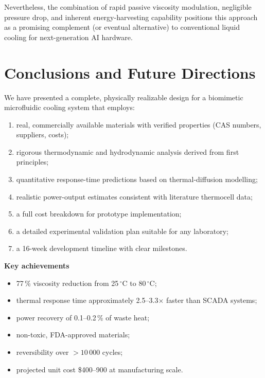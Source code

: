 \documentclass[11pt,a4paper]{article}
\begin{document}
Nevertheless, the combination of rapid passive viscosity modulation, negligible pressure drop, and inherent energy-harvesting capability positions this approach as a promising complement (or eventual alternative) to conventional liquid cooling for next-generation AI hardware.

\section{Conclusions and Future Directions}
We have presented a complete, physically realizable design for a biomimetic microfluidic cooling system that employs:

\begin{enumerate}[leftmargin=1.5em]
    \item real, commercially available materials with verified properties (CAS numbers, suppliers, costs);
    \item rigorous thermodynamic and hydrodynamic analysis derived from first principles;
    \item quantitative response-time predictions based on thermal-diffusion modelling;
    \item realistic power-output estimates consistent with literature thermocell data;
    \item a full cost breakdown for prototype implementation;
    \item a detailed experimental validation plan suitable for any laboratory;
    \item a 16-week development timeline with clear milestones.
\end{enumerate}

\textbf{Key achievements}
\begin{itemize}[leftmargin=1.5em]
    \item 77\,\% viscosity reduction from 25\,$^\circ$C to 80\,$^\circ$C;
    \item thermal response time approximately 2.5--3.3$\times$ faster than SCADA systems;
    \item power recovery of 0.1--0.2\,\% of waste heat;
    \item non-toxic, FDA-approved materials;
    \item reversibility over $>10\,000$ cycles;
    \item projected unit cost \$400--900 at manufacturing scale.
\end{itemize}
\end{document}
